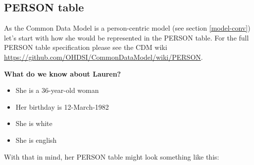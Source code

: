 \documentclass[]{book}
\providecommand{\tightlist}{%
  \setlength{\itemsep}{0pt}\setlength{\parskip}{0pt}}
\begin{document}
\subsection{PERSON table}\label{person}

As the Common Data Model is a person-centric model (see section
\ref{model-conv}) let's start with how she would be represented in the
PERSON table. For the full PERSON table specification please see the CDM
wiki \url{https://github.com/OHDSI/CommonDataModel/wiki/PERSON}.

\textbf{What do we know about Lauren?}

\begin{itemize}
\tightlist
\item
  She is a 36-year-old woman
\item
  Her birthday is 12-March-1982
\item
  She is white
\item
  She is english
\end{itemize}

With that in mind, her PERSON table might look something like this:
\end{document}
